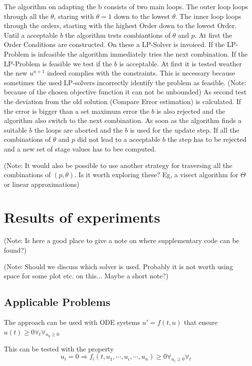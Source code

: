 \documentclass{article}
\begin{document}
The algorithm on adapting the b consists of two main loops. The outer loop loops through all the $\theta$, staring with $\theta = 1$ down to the lowest $\theta$. The inner loop loops through the orders, starting with the highest Order down to the lowest Order. 
Until a acceptable $b$ the algorithm tests combiantions of $\theta$ and $p$. At first the Order Conditions are constructed. On these a LP-Solver is invoiced. If the LP-Problem is infeasible the algorithm immediately tries the next combination. If the LP-Problem is feasible we test if the $b$ is acceptable. At first it is tested weather the new $u^{n+1}$ indeed complies with the constraints. This is necessary because sometimes the used LP-solvers incorrectly identify the problem as feasible. (Note: because of the chosen objective function it can not be unbounded) As second test the deviation from the old solution (Compare Error estimation) is calculated. If the error is bigger than a set maximum error the $b$ is also rejected and the algorithm also switch to the next combination.
As soon as the algorithm finds a suitable $b$ the loops are aborted and the $b$ is used for the update step.
If all the combinations of $\theta$ and $p$ did not lead to a acceptable $b$ the step has to be rejected and a new set of stage values has to bee computed.

(Note: It would also be possible to use another strategy for traversing all the combinations of $(p,\theta)$. Is it worth exploring these? Eg, a visect algorithm for $\Theta$ or linear approximations)



\section{Results of experiments}\label{sec:Numeric_Results}

(Note: Is here a good place to give a note on where supplementary code can be found?)

(Note: Should we discuss which solver is used. Probably it is not worth using space for some plot etc. on this... Maybe a short note?)

\subsection{Applicable Problems}\label{sec:app_problem}
The approach can be used with ODE systems $u' = f(t,u)$ that ensure  $u(t) \geq 0 \forall_t \forall_{  u_0 \geq 0}$ 

This can be tested with the property 
\begin{equation}
u_i=0 \Rightarrow f_i(t,u_1,\cdots,u_i,\cdots,u_n) \geq 0  \forall_{u_c \geq 0} \forall_{t}
\end{equation}
\end{document}
